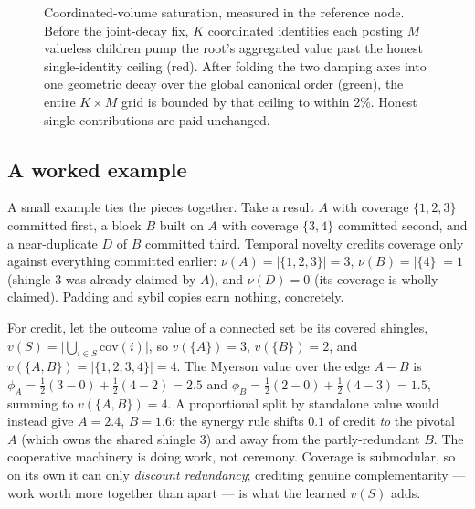 \documentclass[10pt]{article}
\begin{document}
\begin{figure}[h]
\centering
{}
\caption{Coordinated-volume saturation, measured in the reference node. Before the joint-decay fix,
$K$ coordinated identities each posting $M$ valueless children pump the root's aggregated value past
the honest single-identity ceiling (red). After folding the two damping axes into one geometric decay
over the global canonical order (green), the entire $K{\times}M$ grid is bounded by that ceiling to
within $2\%$. Honest single contributions are paid unchanged.}
\label{fig:sat}
\end{figure}

\subsection{A worked example}

A small example ties the pieces together. Take a result $A$ with coverage $\{1,2,3\}$ committed first, a
block $B$ built on $A$ with coverage $\{3,4\}$ committed second, and a near-duplicate $D$ of $B$
committed third. Temporal novelty credits coverage only against everything committed earlier:
$\nu(A)=|\{1,2,3\}|=3$, $\nu(B)=|\{4\}|=1$ (shingle $3$ was already claimed by $A$), and $\nu(D)=0$
(its coverage is wholly claimed). Padding and sybil copies earn nothing, concretely.

For credit, let the outcome value of a connected set be its covered shingles,
$v(S)=\big|\bigcup_{i\in S}\mathrm{cov}(i)\big|$, so $v(\{A\})=3$, $v(\{B\})=2$, and
$v(\{A,B\})=|\{1,2,3,4\}|=4$. The Myerson value over the edge $A\!-\!B$ is
$\phi_A=\tfrac12(3-0)+\tfrac12(4-2)=2.5$ and $\phi_B=\tfrac12(2-0)+\tfrac12(4-3)=1.5$, summing to
$v(\{A,B\})=4$. A proportional split by standalone value would instead give $A=2.4$, $B=1.6$: the
synergy rule shifts $0.1$ of credit \emph{to} the pivotal $A$ (which owns the shared shingle $3$) and
away from the partly-redundant $B$. The cooperative machinery is doing work, not ceremony. Coverage is
submodular, so on its own it can only \emph{discount redundancy}; crediting genuine complementarity ---
work worth more together than apart --- is what the learned $v(S)$ adds.
\end{document}
